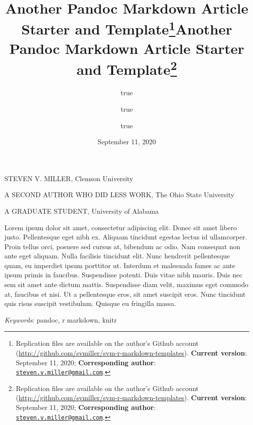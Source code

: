 \documentclass[
      11pt,
                      ]{article}
\title{Another Pandoc Markdown Article
Starter and Template\thanks{Replication files are available on the
author's Github account
(\url{http://github.com/svmiller/svm-r-markdown-templates}).
\textbf{Current version}: September 11, 2020; \textbf{Corresponding
author}:
\href{mailto:steven.v.miller@gmail.com}{\nolinkurl{steven.v.miller@gmail.com}}.}}
\author{true \and true \and true}
\date{September 11, 2020}
\title{Another Pandoc Markdown
Article Starter and Template\thanks{Replication files are available on
the author's Github account
(\url{http://github.com/svmiller/svm-r-markdown-templates}).
\textbf{Current version}: September 11, 2020; \textbf{Corresponding
author}:
\href{mailto:steven.v.miller@gmail.com}{\nolinkurl{steven.v.miller@gmail.com}}.}  }
\date{}
\renewenvironment{abstract}
                  {{%
                    \setlength{\leftmargin}{0mm}
                    \setlength{\rightmargin}{\leftmargin}%
                  }%
                    \relax}
                  {\endlist}
\begin{document}



{%
\setlength{\parindent}{0pt}
\thispagestyle{plain}
{%
\maketitle  %

}




{
   \vskip 13.5pt\relax \normalsize\fontsize{11}{12} 
   \MakeUppercase{\textsf{\large Steven V. Miller}}, \small{Clemson
University}   \par \MakeUppercase{\textsf{\large A Second Author Who Did
Less Work}}, \small{The Ohio State
University}   \par \MakeUppercase{\textsf{\large A Graduate
Student}}, \small{University of Alabama}   

}

}








\begin{abstract}


    \vskip 8.5pt %

\noindent \small{Lorem ipsum dolor sit amet, consectetur adipiscing
elit. Donec sit amet libero justo. Pellentesque eget nibh ex. Aliquam
tincidunt egestas lectus id ullamcorper. Proin tellus orci, posuere sed
cursus at, bibendum ac odio. Nam consequat non ante eget aliquam. Nulla
facilisis tincidunt elit. Nunc hendrerit pellentesque quam, eu imperdiet
ipsum porttitor ut. Interdum et malesuada fames ac ante ipsum primis in
faucibus. Suspendisse potenti. Duis vitae nibh mauris. Duis nec sem sit
amet ante dictum mattis. Suspendisse diam velit, maximus eget commodo
at, faucibus et nisi. Ut a pellentesque eros, sit amet suscipit eros.
Nunc tincidunt quis risus suscipit vestibulum. Quisque eu fringilla
massa.}


\vskip 8.5pt \noindent \emph{Keywords}: pandoc, r markdown, knitr \par




\end{abstract}


\vskip -8.5pt

{
\hypersetup{linkcolor=black}
\setcounter{tocdepth}{2}
\tableofcontents
}


{
\setcounter{tocdepth}{2}
\tableofcontents
}

\setlength{\parindent}{16pt}
\setlength{\parskip}{0pt}
\end{document}
